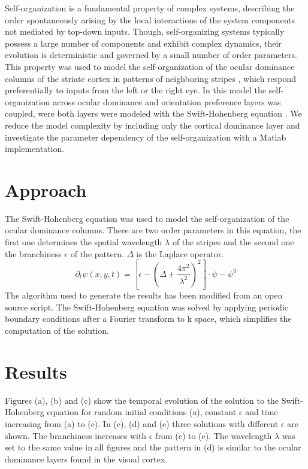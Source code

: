 \documentclass[twocolumn]{bmcart}%
\begin{document}
Self-organization is a fundamental property of complex systems,
describing the order spontaneously arising by the local interactions of
the system components not mediated by top-down inputs. Though,
self-organizing systems typically possess a large number of components
and exhibit complex dynamics, their evolution is deterministic and
governed by a small number of order parameters. This property was used
to model the self-organization of the ocular dominance columns of
the striate cortex in patterns of neighboring stripes \cite{Reichl2012}, 
which respond preferentially to inputs from the left or the right eye. 
In this model the self-organization across ocular dominance and 
orientation preference layers was coupled, were both layers were modeled 
with the Swift-Hohenberg equation \cite{Hohenberg1992}. We reduce the model 
complexity by including only the cortical dominance layer and investigate the 
parameter dependency of the self-organization with a Matlab implementation. 

\section{Approach}\label{approach}

The Swift-Hohenberg equation \cite{Hohenberg1992} was used to model the 
self-organization of the ocular dominance columns. There are two order 
parameters in this equation, the first one determines the spatial wavelength 
\(\lambda\) of the stripes and the second one the branchiness \(\epsilon\) 
of the pattern. $\Delta$ is the Laplace operator.
\begin{equation}
\partial_{t}\psi{(x,y,t)}= [\epsilon-(\Delta+\frac{4\pi^2}{\lambda^2})^2]\cdot\psi - \psi^3
\end{equation}
The algorithm used to generate the results has been modified
from an open source script. The Swift-Hohenberg equation was solved by 
applying periodic boundary conditions after a Fourier transform to k space, 
which simplifies the computation of the solution.

\section{Results}\label{results}

Figures (a), (b) and (c) show the temporal evolution of the solution to
the Swift-Hohenberg equation for random initial conditions (a), constant
\(\epsilon\) and time increasing from (a) to (c). In (c), (d) and (e)
three solutions with different \(\epsilon\) are shown. The branchiness
increases with \(\epsilon\) from (c) to (e). The wavelength \(\lambda\)
was set to the same value in all figures and the pattern in (d) is
similar to the ocular dominance layers found in the visual cortex.
\end{document}
